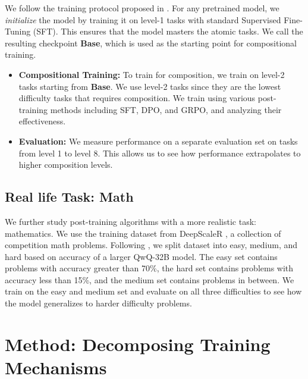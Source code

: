 \documentclass{article}
\newcommand{\el}[1]{\textcolor{purple}{EL: #1}}
\newcommand{\jk}[1]{\textcolor{blue}{JK: #1}}
\begin{document}
We follow the training protocol proposed in \citet{yuanLLMsLearnNewSkills2025}. For any pretrained model, we \emph{initialize} the model by training it on level-1 tasks with standard Supervised Fine-Tuning (SFT). This ensures that the model masters the atomic tasks. We call the resulting checkpoint \textbf{Base}, which is used as the starting point for compositional training.
\begin{itemize} 
\item \textbf{Compositional Training:} To train for composition, we train on level-2 tasks starting from \textbf{Base}. We use level-2 tasks since they are the lowest difficulty tasks that requires composition. We train using various post-training methods including SFT, DPO, and GRPO, and analyzing their effectiveness.
\item \textbf{Evaluation:} We measure performance on a separate evaluation set on tasks from level 1 to level 8. This allows us to see how performance extrapolates to higher composition levels.
\end{itemize}


\subsection{Real life Task: Math}
We further study post-training algorithms with a more realistic task: mathematics. We use the training dataset from DeepScaleR \citep{deepscaler2025}, a collection of competition math problems. Following \citet{setlurE3LearningExplore2025}, we split dataset into easy, medium, and hard based on accuracy of a larger QwQ-32B model. The easy set contains problems with accuracy greater than 70\%, the hard set contains problems with accuracy less than 15\%, and the medium set contains problems in between. We train on the easy and medium set and evaluate on all three difficulties to see how the model generalizes to harder difficulty problems.




\section{Method: Decomposing Training Mechanisms}
\end{document}
